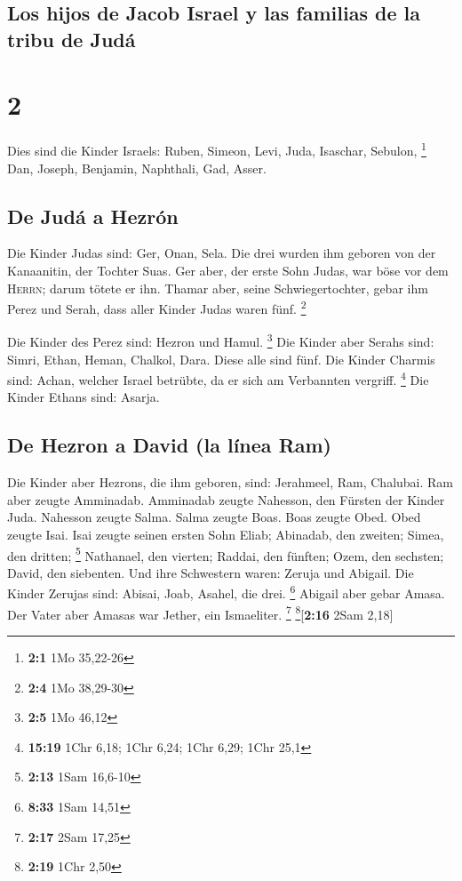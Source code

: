 \hypertarget{los-hijos-de-jacob-israel-y-las-familias-de-la-tribu-de-juduxe1}{%
\subsection{Los hijos de Jacob Israel y las familias de la tribu de
Judá}\label{los-hijos-de-jacob-israel-y-las-familias-de-la-tribu-de-juduxe1}}

\hypertarget{section-1}{%
\section{2}\label{section-1}}

 Dies sind die Kinder Israels: Ruben, Simeon, Levi, Juda,
Isaschar, Sebulon, \footnote{\textbf{2:1} 1Mo 35,22-26} 
Dan, Joseph, Benjamin, Naphthali, Gad, Asser.

\hypertarget{de-juduxe1-a-hezruxf3n}{%
\subsection{De Judá a Hezrón}\label{de-juduxe1-a-hezruxf3n}}

 Die Kinder Judas sind: Ger, Onan, Sela. Die drei wurden
ihm geboren von der Kanaanitin, der Tochter Suas. Ger aber, der erste
Sohn Judas, war böse vor dem \textsc{Herrn}; darum tötete er ihn.
 Thamar aber, seine Schwiegertochter, gebar ihm Perez und
Serah, dass aller Kinder Judas waren fünf. \footnote{\textbf{2:4} 1Mo
  38,29-30}

 Die Kinder des Perez sind: Hezron und Hamul. \footnote{\textbf{2:5}
  1Mo 46,12}  Die Kinder aber Serahs sind: Simri, Ethan,
Heman, Chalkol, Dara. Diese alle sind fünf.  Die Kinder
Charmis sind: Achan, welcher Israel betrübte, da er sich am Verbannten
vergriff. \footnote{\textbf{15:19} 1Chr 6,18; 1Chr 6,24; 1Chr 6,29; 1Chr
  25,1}  Die Kinder Ethans sind: Asarja.

\hypertarget{de-hezron-a-david-la-luxednea-ram}{%
\subsection{De Hezron a David (la línea
Ram)}\label{de-hezron-a-david-la-luxednea-ram}}

 Die Kinder aber Hezrons, die ihm geboren, sind:
Jerahmeel, Ram, Chalubai.  Ram aber zeugte Amminadab.
Amminadab zeugte Nahesson, den Fürsten der Kinder Juda. 
Nahesson zeugte Salma. Salma zeugte Boas.  Boas zeugte
Obed. Obed zeugte Isai.  Isai zeugte seinen ersten Sohn
Eliab; Abinadab, den zweiten; Simea, den dritten; \footnote{\textbf{2:13}
  1Sam 16,6-10}  Nathanael, den vierten; Raddai, den
fünften;  Ozem, den sechsten; David, den siebenten.
 Und ihre Schwestern waren: Zeruja und Abigail. Die
Kinder Zerujas sind: Abisai, Joab, Asahel, die drei. \footnote{\textbf{8:33}
  1Sam 14,51}  Abigail aber gebar Amasa. Der Vater aber
Amasas war Jether, ein Ismaeliter. \footnote{\textbf{2:17} 2Sam 17,25}
\footnote{\textbf{2:19} 1Chr 2,50}{[}\textbf{2:16} 2Sam 2,18{]}

